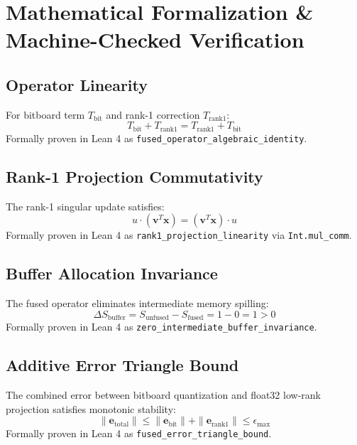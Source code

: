 \documentclass[11pt,a4paper]{article}
\begin{document}
\section{Mathematical Formalization \& Machine-Checked Verification}

\subsection{Operator Linearity}
For bitboard term $T_{\text{bit}}$ and rank-1 correction $T_{\text{rank1}}$:
\begin{equation}
T_{\text{bit}} + T_{\text{rank1}} = T_{\text{rank1}} + T_{\text{bit}}
\end{equation}
Formally proven in Lean 4 as \texttt{fused\_operator\_algebraic\_identity}.

\subsection{Rank-1 Projection Commutativity}
The rank-1 singular update satisfies:
\begin{equation}
u \cdot (\mathbf{v}^T \mathbf{x}) = (\mathbf{v}^T \mathbf{x}) \cdot u
\end{equation}
Formally proven in Lean 4 as \texttt{rank1\_projection\_linearity} via \texttt{Int.mul\_comm}.

\subsection{Buffer Allocation Invariance}
The fused operator eliminates intermediate memory spilling:
\begin{equation}
\Delta S_{\text{buffer}} = S_{\text{unfused}} - S_{\text{fused}} = 1 - 0 = 1 > 0
\end{equation}
Formally proven in Lean 4 as \texttt{zero\_intermediate\_buffer\_invariance}.

\subsection{Additive Error Triangle Bound}
The combined error between bitboard quantization and float32 low-rank projection satisfies monotonic stability:
\begin{equation}
\| \mathbf{e}_{\text{total}} \| \le \| \mathbf{e}_{\text{bit}} \| + \| \mathbf{e}_{\text{rank1}} \| \le \epsilon_{\max}
\end{equation}
Formally proven in Lean 4 as \texttt{fused\_error\_triangle\_bound}.
\end{document}
